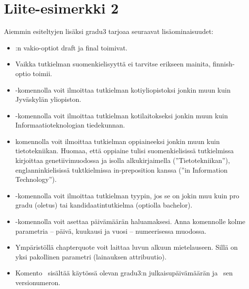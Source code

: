 \documentclass[utf8]{gradu3}
\begin{document}
\section{Liite-esimerkki 2}

Aiemmin esiteltyjen lisäksi gradu3 tarjoaa seuraavat lisäominaisuudet:
\begin{itemize}
\item \LaTeXe:n vakio-optiot draft ja final toimivat.
\item Vaikka tutkielman suomenkielisyyttä ei tarvitse erikseen
  mainita, finnish-optio toimii.
\item \string\university-komennolla voit ilmoittaa tutkielman
  kotiyliopistoksi jonkin muun kuin Jyväskylän yliopiston.
\item  \string\department-komennolla voit ilmoittaa tutkielman
  kotilaitokseksi jonkin muun kuin Informaatioteknologian tiedekunnan.
\item \string\subject-komennolla voit ilmoittaa tutkielman
  oppiaineeksi jonkin muun kuin tietotekniikan.  Huomaa, että oppiaine
  tulisi suomenkielisissä tutkielmissa kirjoittaa genetiivimuodossa ja
  isolla alkukirjaimella (''Tietotekniikan''), englanninkielisissä
  tuktkielmissa in-preposition kanssa (''in Information Technology'').
\item \string\type-komennolla voit ilmoittaa tutkielman tyypin, jos se
  on jokin muu kuin pro gradu (oletus) tai kandidaatintutkielma
  (optiolla bachelor).
\item \string\setdate-komennolla voit asettaa päivämäärän
  haluamaksesi.  Anna komennolle kolme parametria -- päivä,
  kuukausi ja vuosi -- numeerisessa muodossa.
\item Ympäristöllä chapterquote voit laittaa luvun alkuun
  mietelauseen.  Sillä on yksi pakollinen parametri (lainauksen
  attribuutio).
\item Komento \string\graduclsdate\ sisältää käytössä olevan gradu3:n
  julkaisupäivämäärän ja \string\graduclsversion\ sen versionumeron.
\end{itemize}
\end{document}

